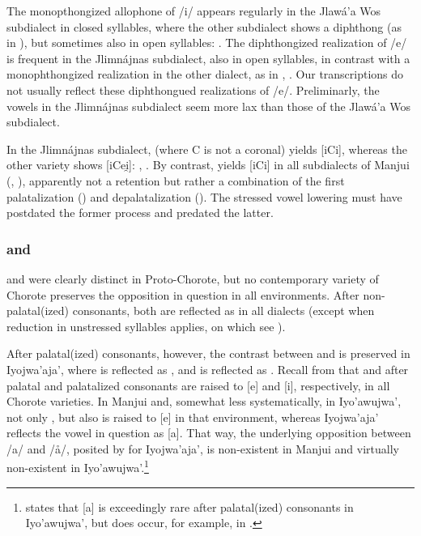 The monopthongized allophone of /i/ appears regularly in the Jlawá'a Wos subdialect in closed syllables, where the other subdialect shows a diphthong (as in ), but sometimes also in open syllables: . The diphthongized realization of /e/ is frequent in the Jlimnájnas subdialect, also in open syllables, in contrast with a monophthongized realization in the other dialect, as in , . Our transcriptions do not usually reflect these diphthongued realizations of /e/. Preliminarly, the vowels in the Jlimnájnas subdialect seem more lax than those of the Jlawá'a Wos subdialect.

In the Jlimnájnas subdialect,  (where C is not a coronal) yields [iCi], whereas the other variety shows [iCei̯]: , . By contrast,  yields [iCi] in all subdialects of Manjui (, ), apparently not a retention but rather a combination of the first palatalization () and depalatalization (). The stressed vowel lowering must have postdated the former process and predated the latter.

\subsubsection{ and }\label{ch-ao-a}

 and  were clearly distinct in Proto-Chorote, but no contemporary variety of Chorote preserves the opposition in question in all environments. After non-palatal(ized) consonants, both are reflected as  in all dialects (except when reduction in unstressed syllables applies, on which see ).

After palatal(ized) consonants, however, the contrast between  and  is preserved in Iyojwa’aja’, where  is reflected as , and  is reflected as . Recall from  that  and  after palatal and palatalized consonants are raised to [e] and [i], respectively, in all Chorote varieties. In Manjui and, somewhat less systematically, in Iyo’awujwa’, not only , but also  is raised to [e] in that environment, whereas Iyojwa’aja’ reflects the vowel in question as [a]. That way, the underlying opposition between /a/ and /å/, posited by \citet[83]{JC14a} for Iyojwa’aja’, is non-existent in Manjui and virtually non-existent in Iyo’awujwa’.\footnote{\citet[83, fn. 12]{JC14a} states that [a] is exceedingly rare after palatal(ized) consonants in Iyo’awujwa’, but does occur, for example, in .}

